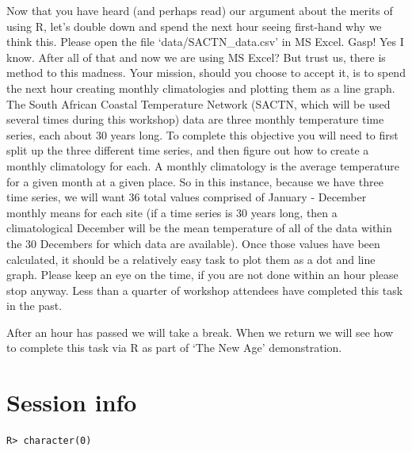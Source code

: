 \documentclass[
]{book}
\newenvironment{Shaded}{\begin{snugshade}}{\end{snugshade}}
\newcommand{\KeywordTok}[1]{\textcolor[rgb]{0.13,0.29,0.53}{\textbf{#1}}}
\newcommand{\NormalTok}[1]{#1}
\newcommand{\OperatorTok}[1]{\textcolor[rgb]{0.81,0.36,0.00}{\textbf{#1}}}
\newcommand{\StringTok}[1]{\textcolor[rgb]{0.31,0.60,0.02}{#1}}
\begin{document}
Now that you have heard (and perhaps read) our argument about the merits of using R, let's double down and spend the next hour seeing first-hand why we think this. Please open the file `data/SACTN\_data.csv' in MS Excel. Gasp! Yes I know. After all of that and now we are using MS Excel? But trust us, there is method to this madness. Your mission, should you choose to accept it, is to spend the next hour creating monthly climatologies and plotting them as a line graph. The South African Coastal Temperature Network (SACTN, which will be used several times during this workshop) data are three monthly temperature time series, each about 30 years long. To complete this objective you will need to first split up the three different time series, and then figure out how to create a monthly climatology for each. A monthly climatology is the average temperature for a given month at a given place. So in this instance, because we have three time series, we will want 36 total values comprised of January - December monthly means for each site (if a time series is 30 years long, then a climatological December will be the mean temperature of all of the data within the 30 Decembers for which data are available). Once those values have been calculated, it should be a relatively easy task to plot them as a dot and line graph. Please keep an eye on the time, if you are not done within an hour please stop anyway. Less than a quarter of workshop attendees have completed this task in the past.

After an hour has passed we will take a break. When we return we will see how to complete this task via R as part of `The New Age' demonstration.

\hypertarget{session-info}{%
\section{Session info}\label{session-info}}

\begin{Shaded}
\end{Shaded}

\begin{verbatim}
R> character(0)
\end{verbatim}
\end{document}
